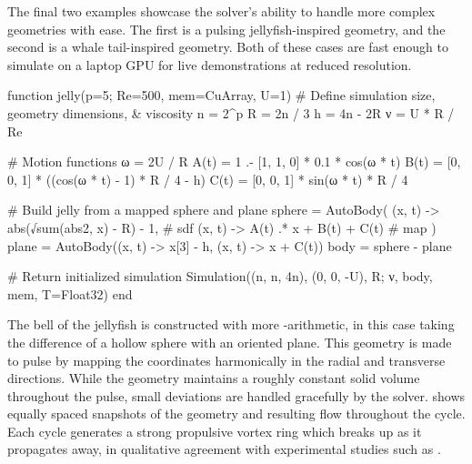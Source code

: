 \documentclass[10pt,a4paper]{article}
\begin{document}
The final two examples showcase the solver's ability to handle more complex geometries with ease. The first is a pulsing jellyfish-inspired geometry, and the second is a whale tail-inspired geometry. Both of these cases are fast enough to simulate on a laptop GPU for live demonstrations at reduced resolution.

\begin{minipage}{\linewidth}
\begin{jllisting}
function jelly(p=5; Re=500, mem=CuArray, U=1)
    # Define simulation size, geometry dimensions, & viscosity
    n = 2^p
    R = 2n / 3
    h = 4n - 2R
    ν = U * R / Re

    # Motion functions
    ω = 2U / R
    A(t) = 1 .- [1, 1, 0] * 0.1 * cos(ω * t)
    B(t) = [0, 0, 1] * ((cos(ω * t) - 1) * R / 4 - h)
    C(t) = [0, 0, 1] * sin(ω * t) * R / 4

    # Build jelly from a mapped sphere and plane
    sphere = AutoBody(
      (x, t) -> abs(√sum(abs2, x) - R) - 1, # sdf
      (x, t) -> A(t) .* x + B(t) + C(t)     # map
    )
    plane = AutoBody((x, t) -> x[3] - h, (x, t) -> x + C(t))
    body =  sphere - plane

    # Return initialized simulation
    Simulation((n, n, 4n), (0, 0, -U), R; ν, body, mem, T=Float32)
end
\end{jllisting}
\end{minipage}

The bell of the jellyfish is constructed with more -arithmetic, in this case taking the difference of a hollow sphere with an oriented plane. This geometry is made to pulse by mapping the coordinates harmonically in the radial and transverse directions. While the geometry maintains a roughly constant solid volume throughout the pulse, small deviations are handled gracefully by the solver.  shows equally spaced snapshots of the geometry and resulting flow throughout the cycle. Each cycle generates a strong propulsive vortex ring which breaks up as it propagates away, in qualitative agreement with experimental studies such as \cite{Dabiri2005}.
\end{document}
